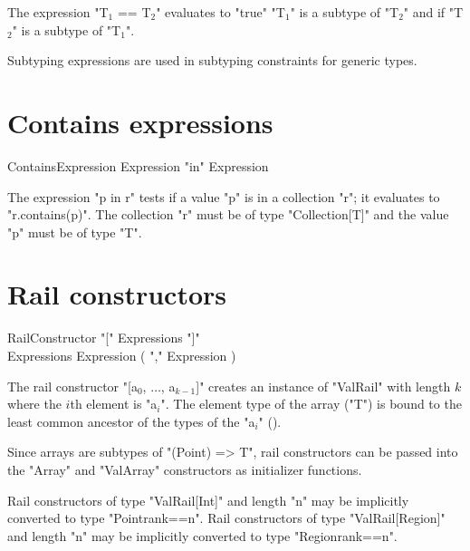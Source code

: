 The expression \xcdmath"T$_1$ == T$_2$"
evaluates to  \xcd"true"  
                         \xcdmath"T$_1$"
                         is a subtype of
                         \xcdmath"T$_2$"
                         and if
                         \xcdmath"T$_2$"
                         is a subtype of
                         \xcdmath"T$_1$".

                         Subtyping expressions are used in
                         subtyping constraints for generic
                         types.

\section{Contains expressions}

\begin{grammar}
ContainsExpression \: Expression \xcd"in" Expression \\
\end{grammar}

The expression \xcd"p in r" tests if a value \xcd"p" is in a collection
\xcd"r"; it evaluates to \xcd"r.contains(p)".
The collection \xcd"r"
must be of type \xcd"Collection[T]" and the value \xcd"p" must
be of type \xcd"T".

\section{Rail constructors}
\label{RailConstructors}

\begin{grammar}
RailConstructor \: \xcd"[" Expressions \xcd"]" \\
Expressions \: Expression ( \xcd"," Expression )\star \\
\end{grammar}

The rail constructor \xcdmath"[a$_0$, $\dots$, a$_{k-1}$]"
creates an instance of \xcd"ValRail" with length $k$
where the $i$th element is
\xcdmath"a$_i$".  The element type of the array (\xcd"T") is
bound to the least common ancestor of the types of the
\xcdmath"a$_i$" ().

Since arrays are subtypes of \xcd"(Point) => T",
rail constructors can be passed into the \xcd"Array" and
\xcd"ValArray" constructors as initializer functions.

Rail constructors of type \xcd"ValRail[Int]" and length \xcd"n" 
may be implicitly converted to type \xcd"Point{rank==n}".
Rail constructors of type \xcd"ValRail[Region]" and length \xcd"n" 
may be implicitly converted to type \xcd"Region{rank==n}".

